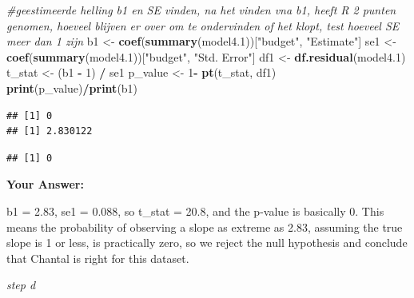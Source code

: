 \documentclass[
]{article}
\newenvironment{Shaded}{\begin{snugshade}}{\end{snugshade}}
\newcommand{\AttributeTok}[1]{\textcolor[rgb]{0.13,0.29,0.53}{#1}}
\newcommand{\CommentTok}[1]{\textcolor[rgb]{0.56,0.35,0.01}{\textit{#1}}}
\newcommand{\ConstantTok}[1]{\textcolor[rgb]{0.56,0.35,0.01}{#1}}
\newcommand{\DecValTok}[1]{\textcolor[rgb]{0.00,0.00,0.81}{#1}}
\newcommand{\FloatTok}[1]{\textcolor[rgb]{0.00,0.00,0.81}{#1}}
\newcommand{\FunctionTok}[1]{\textcolor[rgb]{0.13,0.29,0.53}{\textbf{#1}}}
\newcommand{\NormalTok}[1]{#1}
\newcommand{\OtherTok}[1]{\textcolor[rgb]{0.56,0.35,0.01}{#1}}
\newcommand{\SpecialCharTok}[1]{\textcolor[rgb]{0.81,0.36,0.00}{\textbf{#1}}}
\newcommand{\StringTok}[1]{\textcolor[rgb]{0.31,0.60,0.02}{#1}}
\begin{document}
\begin{Shaded}
\begin{Highlighting}[]
\CommentTok{\#geestimeerde helling b1 en SE vinden, na het vinden vna b1, heeft R 2 punten genomen, hoeveel blijven er over om te ondervinden of het klopt, test hoeveel SE meer dan 1 zijn}
\NormalTok{b1 }\OtherTok{\textless{}{-}} \FunctionTok{coef}\NormalTok{(}\FunctionTok{summary}\NormalTok{(model4}\FloatTok{.1}\NormalTok{))[}\StringTok{"budget"}\NormalTok{, }\StringTok{"Estimate"}\NormalTok{]}
\NormalTok{se1 }\OtherTok{\textless{}{-}} \FunctionTok{coef}\NormalTok{(}\FunctionTok{summary}\NormalTok{(model4}\FloatTok{.1}\NormalTok{))[}\StringTok{"budget"}\NormalTok{, }\StringTok{"Std. Error"}\NormalTok{]}
\NormalTok{df1 }\OtherTok{\textless{}{-}} \FunctionTok{df.residual}\NormalTok{(model4}\FloatTok{.1}\NormalTok{)}
\NormalTok{t\_stat }\OtherTok{\textless{}{-}}\NormalTok{ (b1 }\SpecialCharTok{{-}} \DecValTok{1}\NormalTok{) }\SpecialCharTok{/}\NormalTok{ se1}
\NormalTok{p\_value }\OtherTok{\textless{}{-}} \DecValTok{1}\SpecialCharTok{{-}} \FunctionTok{pt}\NormalTok{(t\_stat, df1)}
\FunctionTok{print}\NormalTok{(p\_value)}\SpecialCharTok{/}\FunctionTok{print}\NormalTok{(b1)}
\end{Highlighting}
\end{Shaded}

\begin{verbatim}
## [1] 0
## [1] 2.830122
\end{verbatim}

\begin{verbatim}
## [1] 0
\end{verbatim}

\textbf{Your Answer:}

b1 = 2.83, se1 = 0.088, so t\_stat = 20.8, and the p-value is basically
0. This means the probability of observing a slope as extreme as 2.83,
assuming the true slope is 1 or less, is practically zero, so we reject
the null hypothesis and conclude that Chantal is right for this dataset.

\emph{step d}

\begin{Shaded}
\end{Shaded}
\end{document}
